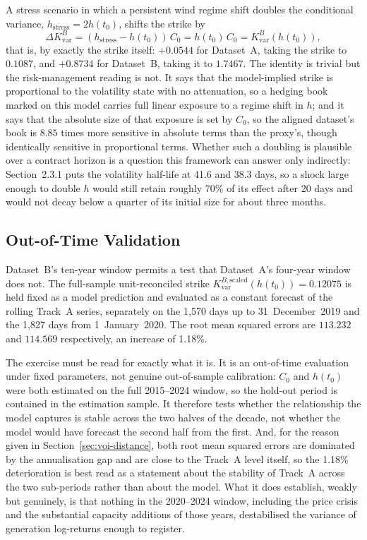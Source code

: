 \documentclass[11pt, a4paper, twoside]{article}
\begin{document}
A stress scenario in which a persistent wind regime shift doubles the conditional variance, $h_{\text{stress}} = 2h(t_0)$, shifts the strike by
\begin{equation}
\Delta K_{\text{var}}^B = (h_{\text{stress}} - h(t_0))\,C_0 = h(t_0)\,C_0 = K_{\text{var}}^B(h(t_0)),
\end{equation}
that is, by exactly the strike itself: $+0.0544$ for Dataset~A, taking the strike to $0.1087$, and $+0.8734$ for Dataset~B, taking it to $1.7467$. The identity is trivial but the risk-management reading is not. It says that the model-implied strike is proportional to the volatility state with no attenuation, so a hedging book marked on this model carries full linear exposure to a regime shift in $h$; and it says that the absolute size of that exposure is set by $C_0$, so the aligned dataset's book is $8.85$ times more sensitive in absolute terms than the proxy's, though identically sensitive in proportional terms. Whether such a doubling is plausible over a contract horizon is a question this framework can answer only indirectly: Section~2.3.1 puts the volatility half-life at 41.6 and 38.3 days, so a shock large enough to double $h$ would still retain roughly 70\% of its effect after 20 days and would not decay below a quarter of its initial size for about three months.

\subsection{Out-of-Time Validation}
\label{sec:oos}

Dataset~B's ten-year window permits a test that Dataset~A's four-year window does not. The full-sample unit-reconciled strike $K_{\text{var}}^{B,\text{scaled}}(h(t_0)) = 0.12075$ is held fixed as a model prediction and evaluated as a constant forecast of the rolling Track~A series, separately on the 1{,}570 days up to 31~December~2019 and the 1{,}827 days from 1~January~2020. The root mean squared errors are $113.232$ and $114.569$ respectively, an increase of 1.18\%.

The exercise must be read for exactly what it is. It is an out-of-time evaluation under fixed parameters, not genuine out-of-sample calibration: $C_0$ and $h(t_0)$ were both estimated on the full 2015--2024 window, so the hold-out period is contained in the estimation sample. It therefore tests whether the relationship the model captures is stable across the two halves of the decade, not whether the model would have forecast the second half from the first. And, for the reason given in Section~\ref{sec:voi-distance}, both root mean squared errors are dominated by the annualisation gap and are close to the Track~A level itself, so the 1.18\% deterioration is best read as a statement about the stability of Track~A across the two sub-periods rather than about the model. What it does establish, weakly but genuinely, is that nothing in the 2020--2024 window, including the price crisis and the substantial capacity additions of those years, destabilised the variance of generation log-returns enough to register.
\end{document}
